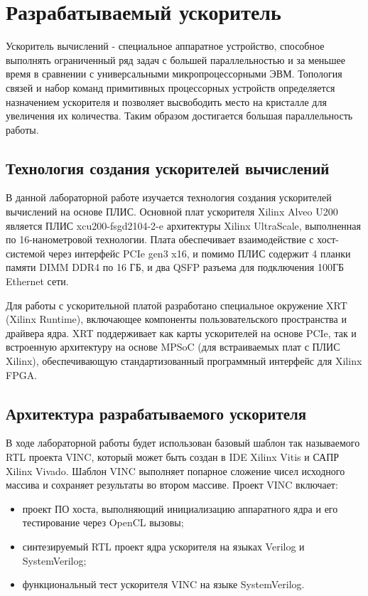 \chapter{Разрабатываемый ускоритель}

Ускоритель вычислений - специальное аппаратное устройство, способное выполнять ограниченный ряд задач с большей параллельностью и за меньшее время в сравнении с универсальными микропроцессорными ЭВМ. Топология связей и набор команд примитивных процессорных устройств определяется назначением ускорителя и позволяет высвободить место на кристалле для увеличения их количества. Таким образом достигается большая параллельность работы.

\section{Технология создания ускорителей вычислений}

В данной лабораторной работе изучается технология создания ускорителей вычислений на основе ПЛИС. Основной плат ускорителя Xilinx Alveo U200 является ПЛИС xcu200-fsgd2104-2-e архитектуры Xilinx UltraScale, выполненная по 16-нанометровой технологии. Плата обеспечивает взаимодействие с хост-системой через интерфейс PCIe gen3 x16, и помимо ПЛИС содержит 4 планки памяти DIMM DDR4 по 16 ГБ, и два QSFP разъема для подключения 100ГБ Ethernet сети.

Для работы с ускорительной платой разработано специальное окружение XRT (Xilinx Runtime), включающее компоненты пользовательского пространства и драйвера ядра. XRT поддерживает как карты ускорителей на основе PCIe, так и встроенную архитектуру на основе MPSoC (для встраиваемых плат с ПЛИС Xilinx), обеспечивающую стандартизованный программный интерфейс для Xilinx FPGA.

\section{Архитектура разрабатываемого ускорителя}

В ходе лабораторной работы будет использован базовый шаблон так называемого RTL проекта VINC, который может быть создан в IDE Xilinx Vitis и САПР Xilinx Vivado. Шаблон VINC выполняет попарное сложение чисел исходного массива и сохраняет результаты во втором массиве. Проект VINC включает:

\begin{itemize}
	\item проект ПО хоста, выполняющий инициализацию аппаратного ядра и его тестирование через OpenCL вызовы;
	\item синтезируемый RTL проект ядра ускорителя на языках Verilog и SystemVerilog;
	\item функциональный тест ускорителя VINC на языке SystemVerilog.
\end{itemize}

